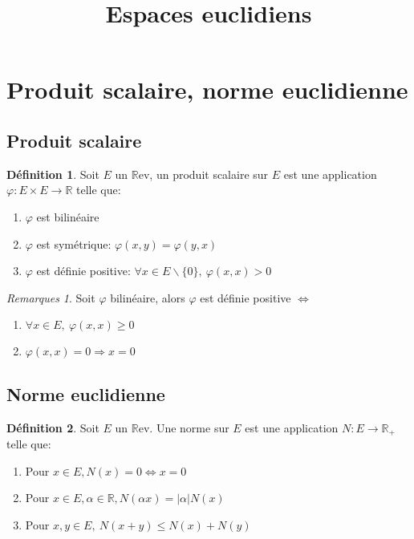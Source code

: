 \documentclass[fleqn]{article}
\title{Espaces euclidiens}
\date{}
\theoremstyle{definition} \newtheorem*{defi}{D\'efinition}
\theoremstyle{definition} \newtheorem*{theo}{Th\'eor\`eme}
\theoremstyle{definition} \newtheorem*{coro}{Corollaire}
\theoremstyle{remark} \newtheorem*{rqs}{Remarques}
\theoremstyle{definition} \newtheorem*{prop}{Propri\'et\'e}
\begin{document}
\maketitle

\section{Produit scalaire, norme euclidienne}

\subsection{Produit scalaire}

\begin{defi} Soit $E$ un $\mathbb{R}$ev, un produit scalaire sur $E$ est une application $\varphi : E \times E \rightarrow \mathbb{R}$ telle que:
	\begin{enumerate}
		\item $\varphi$ est bilin\'eaire
		\item $\varphi$ est sym\'etrique: $\varphi(x,y) = \varphi(y,x)$
		\item $\varphi$ est d\'efinie positive: $\forall x \in E \backslash \{0\},\ \varphi(x,x) > 0$
	\end{enumerate}
\end{defi}

\begin{rqs} Soit $\varphi$ bilin\'eaire, alors $\varphi$ est d\'efinie positive $\Leftrightarrow$ \begin{enumerate}
	\item $\forall x \in E,\ \varphi(x,x) \geq 0$
	\item $\varphi(x,x) = 0 \Rightarrow x = 0$
	\end{enumerate}
\end{rqs}


\subsection{Norme euclidienne}

\begin{defi} Soit $E$ un $\mathbb{R}$ev. Une norme sur $E$ est une application $N:E \rightarrow \mathbb{R}_+$ telle que:
	\begin{enumerate}
		\item Pour $x \in E, N(x) = 0 \Leftrightarrow x = 0$
		\item Pour $x \in E, \alpha \in \mathbb{R}, N(\alpha x) = |\alpha| N(x)$
		\item Pour $x,y \in E,\ N(x+y) \leq N(x) + N(y)$
	\end{enumerate}
\end{defi}
\end{document}
